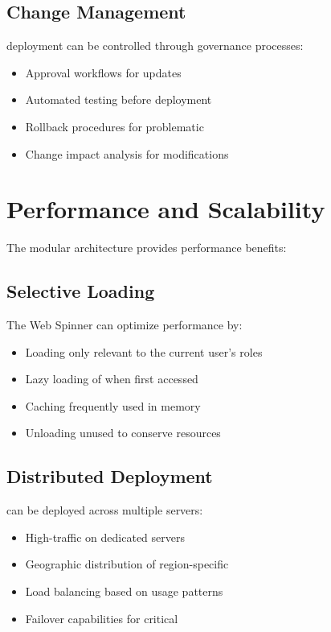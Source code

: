 \subsection{Change Management}

\webbaselet{} deployment can be controlled through governance processes:
\begin{itemize}
\item Approval workflows for \webbaselet{} updates
\item Automated testing before \webbaselet{} deployment
\item Rollback procedures for problematic 
\item Change impact analysis for \webbaselet{} modifications
\end{itemize}

\section{Performance and Scalability}
\label{sec:performance-scalability}

The modular architecture provides performance benefits:

\subsection{Selective Loading}

The Web Spinner can optimize performance by:
\begin{itemize}
\item Loading only  relevant to the current user's roles
\item Lazy loading of  when first accessed
\item Caching frequently used  in memory
\item Unloading unused  to conserve resources
\end{itemize}

\subsection{Distributed Deployment}

 can be deployed across multiple servers:
\begin{itemize}
\item High-traffic  on dedicated servers
\item Geographic distribution of region-specific 
\item Load balancing based on \webbaselet{} usage patterns
\item Failover capabilities for critical 
\end{itemize}

